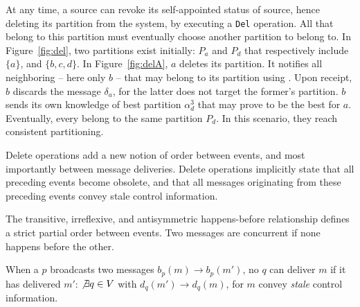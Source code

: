 At any time, a source can revoke its self-appointed status of source,
hence deleting its partition from the system, by executing a
\texttt{Del} operation. All \processes that belong to this partition
must eventually choose another partition to belong to. In
Figure~\ref{fig:del}, two partitions exist initially: $P_a$ and $P_d$
that respectively include $\{a\}$, and $\{b, c, d\}$. In
Figure~\ref{fig:delA}, \Process $a$ deletes its partition. It notifies
all neighboring \processes -- here only \Process $b$ -- that may
belong to its partition using \NAMEB. Upon receipt, \Process $b$
discards the message $\delta_a$, for the latter does not target the
former's partition. \Process $b$ sends its own knowledge of best
partition $\alpha_d^3$ that may prove to be the best for \Process
$a$. Eventually, every \processes belong to the same partition
$P_d$. In this scenario, they reach consistent partitioning.

Delete operations add a new notion of order between events, and most
importantly between message deliveries. Delete operations implicitly
state that all preceding events become obsolete, and that all messages
originating from these preceding events convey stale control
information.

\begin{definition}
  The transitive, irreflexive, and antisymmetric happens-before
  relationship defines a strict partial order between events. Two
  messages are concurrent if none happens before the other.
\end{definition}

\begin{definition}
  When a \process $p$ broadcasts two messages $b_p(m) \rightarrow
  b_p(m')$, no \process $q$ can deliver $m$ if it has delivered $m'$:
  $\not\exists q \in V$ with $d_q(m') \rightarrow d_q(m)$, for $m$
  convey \emph{stale} control information.
\end{definition}



